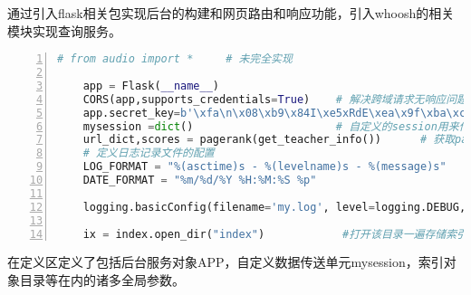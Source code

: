 \documentclass[lang=cn,11pt]{elegantpaper}
\begin{document}
通过引入flask相关包实现后台的构建和网页路由和响应功能，引入whoosh的相关模块实现查询服务。

\begin{lstlisting}[language =Python, numbers=left, 
numberstyle=\tiny,keywordstyle=\color{blue!70},
commentstyle=\color{red!50!green!50!blue!50},frame=shadowbox,
rulesepcolor=\color{red!20!green!20!blue!20},basicstyle=\ttfamily]
	# from audio import *     # 未完全实现
	
	app = Flask(__name__)
	CORS(app,supports_credentials=True)    # 解决跨域请求无响应问题
	app.secret_key=b'\xfa\n\x08\xb9\x84I\xe5xRdE\xea\x9f\xba\xce\x81'
	mysession =dict()                      # 自定义的session用来传输数据
	url_dict,scores = pagerank(get_teacher_info())      # 获取pageranke计算结果，返回链接映射和排名得分
	# 定义日志记录文件的配置
	LOG_FORMAT = "%(asctime)s - %(levelname)s - %(message)s"
	DATE_FORMAT = "%m/%d/%Y %H:%M:%S %p"
	
	logging.basicConfig(filename='my.log', level=logging.DEBUG, format=LOG_FORMAT, datefmt=DATE_FORMAT)
	
	ix = index.open_dir("index")            #打开该目录一遍存储索引文件
\end{lstlisting}

在定义区定义了包括后台服务对象APP，自定义数据传送单元mysession，索引对象目录等在内的诸多全局参数。
\end{document}
